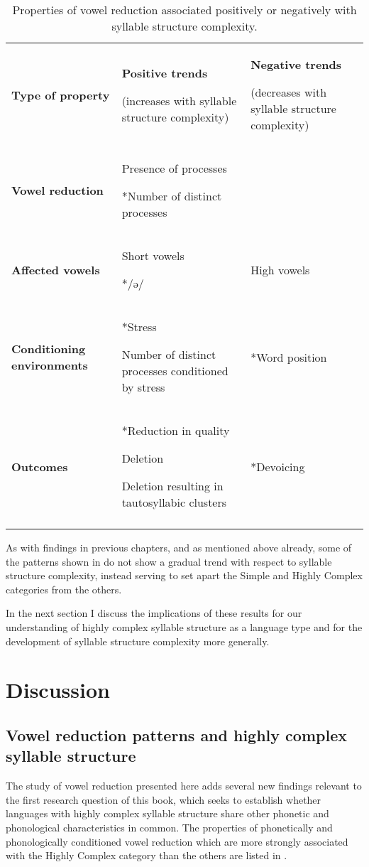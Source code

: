 \begin{table}
\begin{tabularx}{\textwidth}{XXX}
\lsptoprule

\textbf{Type of property} & \textbf{Positive trends}

(increases with syllable structure complexity) & \textbf{Negative trends}

(decreases with syllable structure complexity)\\
\textbf{Vowel reduction} & Presence of processes

*Number of distinct processes & \\
\textbf{Affected vowels} & Short vowels

*/ə/ & High vowels\\
\textbf{Conditioning environments} & *Stress

Number of distinct processes conditioned by stress & *Word position\\
\textbf{Outcomes} & *Reduction in quality

Deletion

Deletion resulting in tautosyllabic clusters & *Devoicing\\
\lspbottomrule
\end{tabularx}
\caption{\label{tab:6.10}Properties of vowel reduction associated positively or negatively with syllable structure complexity.}
\end{table}

  As with findings in previous chapters, and as mentioned above already, some of the patterns shown in  do not show a gradual trend with respect to syllable structure complexity, instead serving to set apart the Simple and Highly Complex categories from the others.

  In the next section I discuss the implications of these results for our understanding of highly complex syllable structure as a language type and for the development of syllable structure complexity more generally.

\section{Discussion}\label{sec:6.4}
\subsection{Vowel reduction patterns and highly complex syllable structure}\label{sec:6.4.1}

  The study of vowel reduction presented here adds several new findings relevant to the first research question of this book, which seeks to establish whether languages with highly complex syllable structure share other phonetic and phonological characteristics in common. The properties of phonetically and phonologically conditioned vowel reduction which are more strongly associated with the Highly Complex category than the others are listed in .

